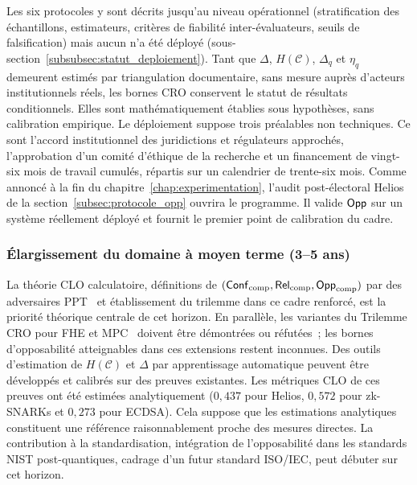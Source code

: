 \begin{sloppypar}
Les six protocoles y sont d\'ecrits jusqu'au niveau op\'erationnel (stratification des \'echantillons, estimateurs, crit\`eres de fiabilit\'e
inter-\'evaluateurs, seuils de falsification) mais aucun n'a \'et\'e
d\'eploy\'e (sous-section~\ref{subsubsec:statut_deploiement}). Tant que
$\Delta$, $H(\mathcal{C})$, $\Delta_q$ et $\eta_q$ demeurent estim\'es
par triangulation documentaire, sans mesure aupr\`es d'acteurs
institutionnels r\'eels, les bornes CRO conservent le statut de
r\'esultats conditionnels. Elles sont math\'ematiquement \'etablies sous
hypoth\`eses, sans calibration empirique. Le d\'eploiement suppose trois pr\'ealables non
techniques. Ce sont l'accord institutionnel des juridictions et r\'egulateurs
approch\'es, l'approbation d'un comit\'e d'\'ethique de la recherche et un
financement de vingt-six mois de travail cumul\'es, r\'epartis sur un calendrier de
trente-six mois. Comme annonc\'e \`a la fin du chapitre~\ref{chap:experimentation}, l'audit post-\'electoral
Helios de la section~\ref{subsec:protocole_opp} ouvrira le programme. Il valide $\mathsf{Opp}$ sur un syst\`eme
r\'eellement d\'eploy\'e et fournit le premier point de calibration du
cadre.

\subsubsection{\'Elargissement du domaine \`a moyen terme (3--5 ans)}
\label{subsubsec:horizon_moyen_terme}

La th\'eorie CLO calculatoire, d\'efinitions de
$(\mathsf{Conf}_\text{comp}, \mathsf{Rel}_\text{comp}, \mathsf{Opp}_\text{comp})$ par des adversaires
PPT~\cite{Goldreich01,Bellare97} et \'etablissement du trilemme dans ce cadre
renforc\'e, est la priorit\'e th\'eorique centrale de cet horizon. En
parall\`ele, les variantes du Trilemme CRO pour FHE et
MPC~\cite{Gentry09,Evans2018} doivent \^etre d\'emontr\'ees ou r\'efut\'ees~;
les bornes d'opposabilit\'e atteignables dans ces extensions restent
inconnues. Des outils d'estimation de $H(\mathcal{C})$ et $\Delta$ par
apprentissage automatique peuvent \^etre d\'evelopp\'es et calibr\'es sur des
preuves existantes. Les m\'etriques CLO de ces preuves ont \'et\'e estim\'ees
analytiquement ($0{,}437$ pour Helios, $0{,}572$ pour zk-SNARKs et $0{,}273$ pour ECDSA). Cela suppose
que les estimations analytiques constituent une r\'ef\'erence
raisonnablement proche des mesures directes. La contribution \`a la
standardisation, int\'egration de l'opposabilit\'e dans les standards NIST
post-quantiques, cadrage d'un futur standard ISO/IEC, peut d\'ebuter sur cet
horizon.


\end{sloppypar}
